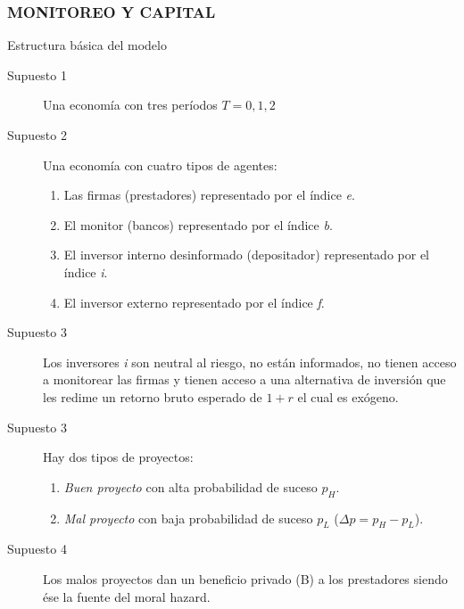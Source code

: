 \documentclass[10pt, xcolor=table, x11names]{beamer}
\begin{document}
\begin{frame}
    \frametitle{{\normalsize MONITOREO Y CAPITAL} {}}
    
    \begin{block} {Estructura básica del modelo}
    	\begin{description}
    		\item[Supuesto 1]  Una economía con tres períodos $T={0,1,2}$
    		\item[Supuesto 2]  Una economía con cuatro tipos de agentes:
    		\begin{enumerate}
    			\item Las firmas (prestadores) representado por el índice \textit{e}.
    			\item El monitor (bancos) representado por el índice \textit{b}.
    			\item El inversor interno desinformado (depositador) representado por el índice \textit{i}.
    			\item El inversor externo  representado por el índice \textit{f}.
    		\end{enumerate}  
    		\item[Supuesto 3] Los inversores \textit{i} son neutral al riesgo, no están informados, no tienen acceso a monitorear las firmas y tienen acceso a una alternativa de inversión que les redime un retorno bruto esperado de $1+r$ el cual es exógeno.
    		\item[Supuesto 3] Hay dos tipos de proyectos:
    		\begin{enumerate}
    			\item \textit{Buen proyecto} con alta probabilidad de suceso $p_{H}$.
    			\item \textit{Mal proyecto} con baja probabilidad de suceso $p_{L}$ ($\Delta p= p_{H}-p_{L}$). 
    		\end{enumerate}
    		\item[Supuesto 4] Los malos proyectos dan un beneficio privado (B) a los prestadores siendo ése la fuente del moral hazard.
    		
    		
    		
    	\end{description}
    	
    \end{block}	
    
\end{frame}
\end{document}
